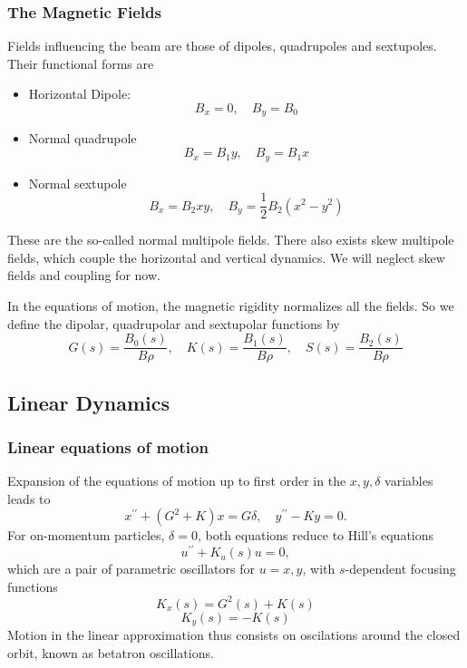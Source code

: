 \subsubsection{The Magnetic Fields}
Fields influencing the beam are those of dipoles, quadrupoles and sextupoles.
Their functional forms are
\begin{itemize}
    \item Horizontal Dipole:\\
           $$ B_x = 0, \quad B_y = B_0$$
    \item Normal quadrupole\\
          $$B_x = B_1 y, \quad B_y = B_1 x$$
    \item Normal sextupole\\
          $$B_x = B_2xy, \quad B_y = \frac{1}{2}B_2(x^2 - y^2)$$
\end{itemize}
These are the so-called normal multipole fields. There also exists skew multipole fields, which couple the horizontal and vertical dynamics. We will neglect skew fields and coupling for now.

In the equations of motion, the magnetic rigidity normalizes all the fields. So we define the dipolar, quadrupolar and sextupolar functions by
$$G(s) = \frac{B_0(s)}{B\rho}, \quad K(s) = \frac{B_1(s)}{B\rho}, \quad S(s) = \frac{B_2(s)}{B\rho}$$

\subsection{Linear Dynamics}
\subsubsection{Linear equations of motion}
Expansion of the equations of motion up to first order in the $x, y, \delta$ variables leads to \cite{sands}
    \begin{equation}
        x^{\prime\prime}+(G^2+K)x=G\delta, \quad
        y^{\prime\prime}-Ky=0.
    \end{equation}
    For on-momentum particles, $\delta=0$, both equations reduce to Hill's equations
    \begin{equation}
        u^{\prime\prime}+K_u(s)u = 0,
    \end{equation}
    which are a pair of parametric oscillators for $u=x,y$, with $s$-dependent focusing functions
         $$K_x(s) = G^2(s) + K(s)$$ $$K_y(s) = - K(s)$$
Motion in the linear approximation thus consists on oscilations around the closed orbit, known as betatron oscillations.
